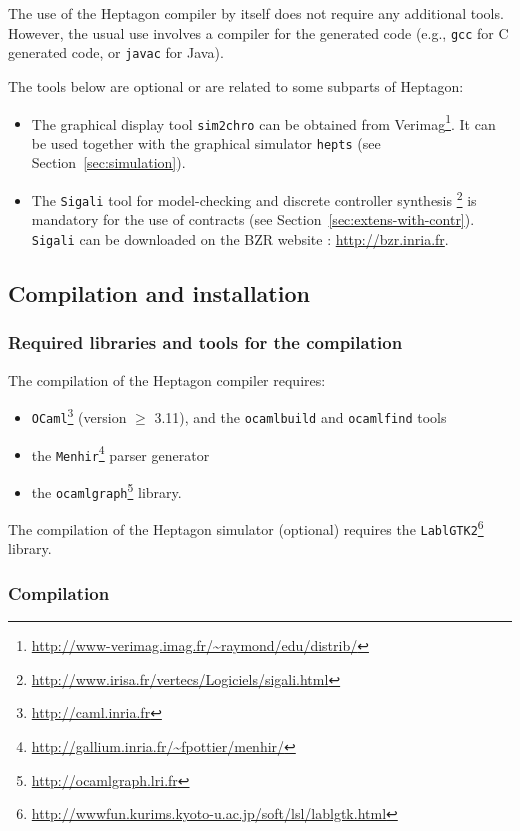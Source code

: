 \documentclass[a4paper]{article}
\begin{document}
The use of the Heptagon compiler by itself does not require any additional
tools. However, the usual use involves a compiler for the generated code (e.g.,
\texttt{gcc} for C generated code, or \texttt{javac} for Java).

The tools below are optional or are related to some subparts of Heptagon:
\begin{itemize}
\item The graphical display tool \texttt{sim2chro} can be obtained from
Verimag\footnote{\url{http://www-verimag.imag.fr/~raymond/edu/distrib/}}. It can
be used together with the graphical simulator \texttt{hepts} (see Section~\ref{sec:simulation}).
\item The \texttt{Sigali} tool for model-checking and discrete controller
  synthesis \cite{sigali}
  \footnote{\url{http://www.irisa.fr/vertecs/Logiciels/sigali.html}} is
  mandatory for the use of contracts (see
  Section~\ref{sec:extens-with-contr}). \texttt{Sigali} can be downloaded on the
  BZR website : \url{http://bzr.inria.fr}.
\end{itemize}

\subsection{Compilation and installation}
\label{sec:comp-inst}

\subsubsection{Required libraries and tools for the compilation}
\label{sec:requ-libr-tools}

The compilation of the Heptagon compiler requires:
\begin{itemize}
\item \texttt{OCaml}\footnote{\url{http://caml.inria.fr}} (version $\geq$
  3.11), and the \texttt{ocamlbuild} and \texttt{ocamlfind} tools
\item the \texttt{Menhir}\footnote{\url{http://gallium.inria.fr/~fpottier/menhir/}} parser generator
\item the \texttt{ocamlgraph}\footnote{\url{http://ocamlgraph.lri.fr}} library.
\end{itemize}

The compilation of the Heptagon simulator (optional) requires the
\texttt{LablGTK2}\footnote{\url{http://wwwfun.kurims.kyoto-u.ac.jp/soft/lsl/lablgtk.html}}
library.


\subsubsection{Compilation}
\label{sec:compilation}
\end{document}
